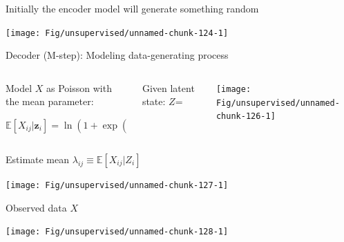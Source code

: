 \documentclass[
  ignorenonframetext,
  aspectratio=169]{beamer}
\begin{document}
\begin{frame}{Initially the encoder model will generate something
random}
\protect\hypertarget{initially-the-encoder-model-will-generate-something-random}{}
\scriptsize

\begin{center}\texttt{[image: Fig/unsupervised/unnamed-chunk-124-1]} \end{center}

\normalsize
\end{frame}

\begin{frame}{Decoder (M-step): Modeling data-generating process}
\protect\hypertarget{decoder-m-step-modeling-data-generating-process}{}
\scriptsize

\normalsize

\begin{columns}[T]
\begin{column}{.5\textwidth}
Model \(X\) as Poisson with the mean parameter:

\(\mathbb{E}\!\left[X_{ij} | \mathbf{z}_{i} \right] = \ln\left( 1 + \exp\left( \sum_{k} Z_{ik} W_{kj} \right) \right)\)
\end{column}

\begin{column}{.25\textwidth}
Given latent state: \(Z\)=
\end{column}

\begin{column}{.25\textwidth}
\scriptsize

\begin{center}\texttt{[image: Fig/unsupervised/unnamed-chunk-126-1]} \end{center}

\normalsize
\end{column}
\end{columns}

Estimate mean
\(\lambda_{ij} \equiv \mathbb{E}\!\left[X_{ij}|Z_{i}\right]\)

\scriptsize

\begin{center}\texttt{[image: Fig/unsupervised/unnamed-chunk-127-1]} \end{center}

\normalsize Observed data \(X\)

\scriptsize

\begin{center}\texttt{[image: Fig/unsupervised/unnamed-chunk-128-1]} \end{center}

\normalsize
\end{frame}
\end{document}
